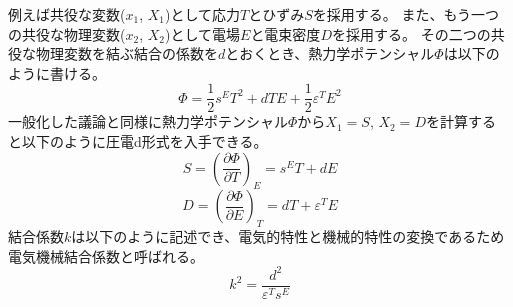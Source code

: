 \documentclass[dvipdfmx,12pt,a4paper]{jreport}
\begin{document}
			例えば共役な変数($x_1$, $X_1$)として応力$T$とひずみ$S$を採用する。
			また、もう一つの共役な物理変数($x_2$, $X_2$)として電場$E$と電束密度$D$を採用する。
			その二つの共役な物理変数を結ぶ結合の係数を$d$とおくとき、熱力学ポテンシャル$\Phi$は以下のように書ける。
			\begin{equation}
				\Phi = \frac{1}{2}s^ET^2 + d T E + \frac{1}{2}\varepsilon^T E^2
			\end{equation}
			一般化した議論と同様に熱力学ポテンシャル$\Phi$から$X_1=S$, $X_2=D$を計算する
			と以下のように圧電d形式を入手できる。
			\begin{equation}
				S = \left(\frac{\partial \Phi}{\partial T} \right)_E = s^E T + d E
			\end{equation}
			\begin{equation}
				D=\left(\frac{\partial \Phi}{\partial E}\right)_T = dT+\varepsilon^T E
			\end{equation}
			結合係数$k$は以下のように記述でき、電気的特性と機械的特性の変換であるため電気機械結合係数と呼ばれる。
			\begin{equation}
				k^2 = \frac{d^2}{\varepsilon^Ts^E}
				\label{電気機械結合係数d}
			\end{equation}
\end{document}
